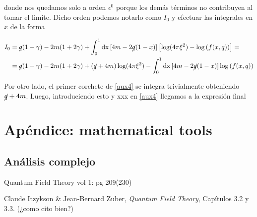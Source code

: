 \documentclass{article}
\numberwithin{equation}{section}
\begin{document}
donde nos quedamos solo a orden $ \epsilon^0 $ porque los demás términos no contribuyen al tomar el limite. Dicho orden podemos notarlo como $ I_0 $  y efectuar las integrales en $ x $ de la forma

\begin{equation}\label{key}
\begin{aligned}
I_0 &= \cancel{q}(1-\gamma) -2m(1 +2\gamma) + \int_{0}^{1} \mathrm{dx} \left[ 4m - 2\cancel{q}(1-x)\right]\left[ \log(4\pi \xi^2) - \log\left(f(x,q)\right)\right] =\\
&= \cancel{q}(1-\gamma) -2m(1 +2\gamma) + \left(\cancel{q}+4m\right)\log(4\pi \xi^2) - \int_{0}^{1} \mathrm{dx} \left[ 4m - 2\cancel{q}(1-x)\right]\log \left(f(x,q)\right) 
\end{aligned}
\end{equation}



Por otro lado, el primer corchete de \ref{aux4} se integra trivialmente obteniendo $ \cancel{q} + 4m $. Luego, introduciendo esto y xxx en \ref{aux4} llegamos a la expresión final   
\section{Apéndice: mathematical tools}

\subsection{Análisis complejo}

Quantum Field Theory vol 1: pg 209(230)


\begin{thebibliography}{9}
	
	Claude Itzykson \& Jean-Bernard Zuber,
	\textit{Quantum Field Theory},
	Capítulos 3.2 y 3.3. (¿como cito bien?)
	
\end{thebibliography}	
	
	
\end{document}

